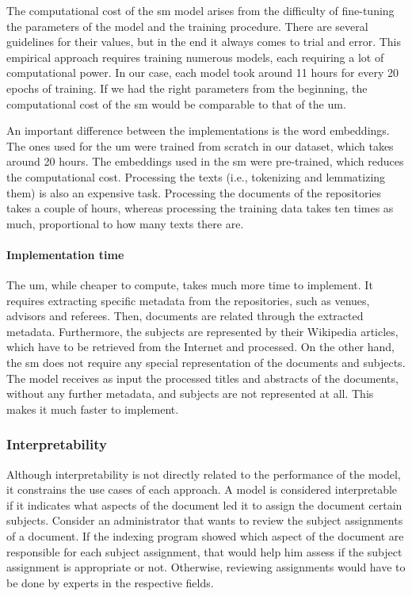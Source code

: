 The computational cost of the \acrshort{sm} model arises from the difficulty of fine-tuning the parameters of the model and the training procedure. There are several guidelines for their values, but in the end it always comes to trial and error. This empirical approach requires training numerous models, each requiring a lot of computational power. In our case, each model took around 11 hours for every 20 epochs of training. If we had the right parameters from the beginning, the computational cost of the \acrshort{sm} would be comparable to that of the \acrshort{um}.

An important difference between the implementations is the word embeddings. The ones used for the \acrshort{um} were trained from scratch in our dataset, which takes around 20 hours. The embeddings used in the \acrshort{sm} were pre-trained, which reduces the computational cost. Processing the texts (i.e., tokenizing and lemmatizing them) is also an expensive task. Processing the documents of the repositories takes a couple of hours, whereas processing the training data takes ten times as much, proportional to how many texts there are.

\paragraph{Implementation time} \mbox{}

The \acrshort{um}, while cheaper to compute, takes much more time to implement. It requires extracting specific metadata from the repositories, such as venues, advisors and referees. Then, documents are related through the extracted metadata. Furthermore, the subjects are represented by their Wikipedia articles, which have to be retrieved from the Internet and processed. On the other hand, the \acrshort{sm} does not require any special representation of the documents and subjects. The model receives as input the processed titles and abstracts of the documents, without any further metadata, and subjects are not represented at all. This makes it much faster to implement.

\subsubsection{Interpretability}

Although interpretability is not directly related to the performance of the model, it constrains the use cases of each approach. A model is considered interpretable if it indicates what aspects of the document led it to assign the document certain subjects. Consider an administrator that wants to review the subject assignments of a document. If the indexing program showed which aspect of the document are responsible for each subject assignment, that would help him assess if the subject assignment is appropriate or not. Otherwise, reviewing assignments would have to be done by experts in the respective fields.

